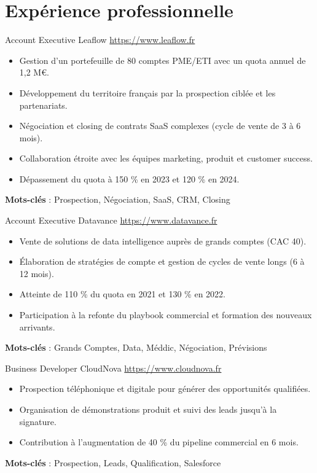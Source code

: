 \documentclass[a4paper, serif, 10pt]{moderncv}
\begin{document}
\section{Expérience professionnelle}

        {Account Executive}
        {Leaflow}
        {\url{https://www.leaflow.fr}}
        {}
        {\begin{itemize}
\item Gestion d'un portefeuille de 80 comptes PME/ETI avec un quota annuel de 1,2 M€.
\item Développement du territoire français par la prospection ciblée et les partenariats.
\item Négociation et closing de contrats SaaS complexes (cycle de vente de 3 à 6 mois).
\item Collaboration étroite avec les équipes marketing, produit et customer success.
\item Dépassement du quota à 150 \% en 2023 et 120 \% en 2024.
\end{itemize}
\textbf{Mots-clés} : Prospection, Négociation, SaaS, CRM, Closing}

        {Account Executive}
        {Datavance}
        {\url{https://www.datavance.fr}}
        {}
        {\begin{itemize}
\item Vente de solutions de data intelligence auprès de grands comptes (CAC 40).
\item Élaboration de stratégies de compte et gestion de cycles de vente longs (6 à 12 mois).
\item Atteinte de 110 \% du quota en 2021 et 130 \% en 2022.
\item Participation à la refonte du playbook commercial et formation des nouveaux arrivants.
\end{itemize}
\textbf{Mots-clés} : Grands Comptes, Data, Méddic, Négociation, Prévisions}

        {Business Developer}
        {CloudNova}
        {\url{https://www.cloudnova.fr}}
        {}
        {\begin{itemize}
\item Prospection téléphonique et digitale pour générer des opportunités qualifiées.
\item Organisation de démonstrations produit et suivi des leads jusqu'à la signature.
\item Contribution à l'augmentation de 40 \% du pipeline commercial en 6 mois.
\end{itemize}
\textbf{Mots-clés} : Prospection, Leads, Qualification, Salesforce}
\end{document}
